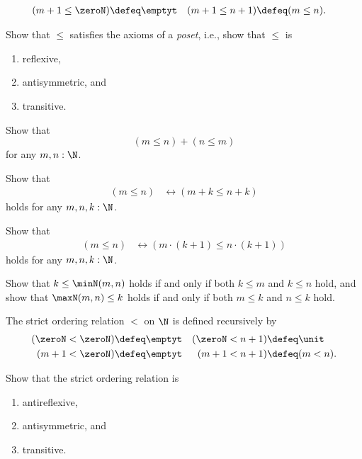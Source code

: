 \begin{exercises}
\begin{align*}
      (m+1\leq\zeroN) & \defeq \emptyt & (m+1\leq n+1) & \defeq (m\leq n).
    \end{align*}
  \begin{subexenum}
  \item Show that $\leq$ satisfies the axioms of a \emph{poset}, i.e., show that $\leq$ is
    \begin{enumerate}
    \item reflexive,
    \item antisymmetric, and
    \item transitive.
    \end{enumerate}
  \item Show that
    \begin{equation*}
      (m\leq n)+(n\leq m)
    \end{equation*}
    for any $m,n:\N$.
  \item Show that
    \begin{align*}
      (m \leq n) & \leftrightarrow (m+k \leq n+k)
    \end{align*}
    holds for any $m,n,k:\N$.
  \item Show that
    \begin{align*}
      (m \leq n) & \leftrightarrow (m\cdot(k+1) \leq n\cdot(k+1))
    \end{align*}
    holds for any $m,n,k:\N$.
  \item Show that $k\leq \minN(m,n)$ holds if and only if both $k\leq m$ and $k\leq n$ hold, and show that $\maxN(m,n)\leq k$ holds if and only if both $m\leq k$ and $n\leq k$ hold.
  \end{subexenum}
  \exitem \label{ex:strict-order-N}The strict ordering relation $<$ on $\N$ is defined recursively by
    \begin{align*}
      (\zeroN<\zeroN) & \defeq \emptyt & (\zeroN< n+1) & \defeq \unit \\
      (m+1<\zeroN) & \defeq \emptyt & (m+1< n+1) & \defeq (m< n).
    \end{align*}
  \begin{subexenum}
  \item Show that the strict ordering relation is
    \begin{enumerate}
    \item antireflexive,
    \item antisymmetric, and
    \item transitive.

\end{enumerate}
\end{subexenum}
\end{exercises}

